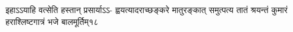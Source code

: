 \fourlineindentedshlokanum
{इहाऽऽयाहि वत्सेति हस्तान् प्रसार्याऽऽ-}
{ह्वयत्यादराच्छङ्करे मातुरङ्कात्}
{समुत्पत्य तातं श्रयन्तं कुमारं}
{हराश्लिष्टगात्रं भजे बालमूर्तिम्}{१८}

%
%
%
%
%
%
%
%
%
%
%
%
%
%
